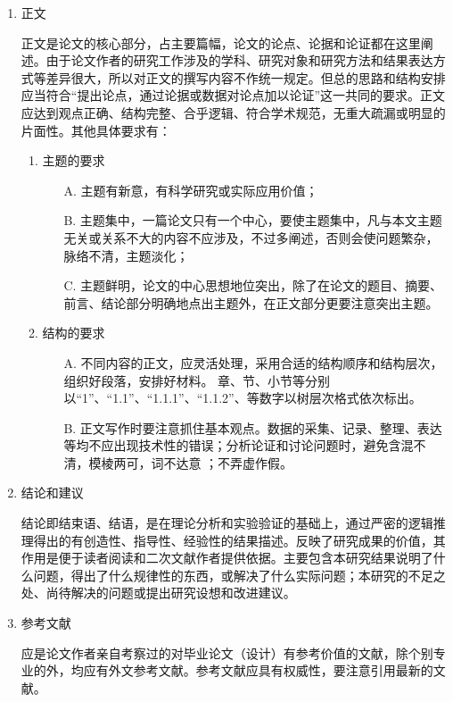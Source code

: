 \begin{itemize}[font=\cusong]
\begin{enumerate}[label=\bfseries\arabic*.]
\item {\cusong 正文}\par
      正文是论文的核心部分，占主要篇幅，论文的论点、论据和论证都在这里阐述。由于论文作者的研究工作涉及的学科、研究对象和研究方法和结果表达方式等差异很大，所以对正文的撰写内容不作统一规定。但总的思路和结构安排应当符合“提出论点，通过论据或数据对论点加以论证”这一共同的要求。正文应达到观点正确、结构完整、合乎逻辑、符合学术规范，无重大疏漏或明显的片面性。其他具体要求有：
\begin{enumerate}[label=(\arabic* )]%
\item 主题的要求\par
\begin{itemize}[fullwidth,itemindent=2em]
\item[A.]	主题有新意，有科学研究或实际应用价值；
\item[B.]	主题集中，一篇论文只有一个中心，要使主题集中，凡与本文主题无关或关系不大的内容不应涉及，不过多阐述，否则会使问题繁杂，脉络不清，主题淡化；
\item[C.]	主题鲜明，论文的中心思想地位突出，除了在论文的题目、摘要、前言、结论部分明确地点出主题外，在正文部分更要注意突出主题。
\end{itemize}
\item 结构的要求\par
\begin{itemize}[fullwidth,itemindent=2em]
\item[A.]	不同内容的正文，应灵活处理，采用合适的结构顺序和结构层次，组织好段落，安排好材料。 章、节、小节等分别以“1”、“1.1”、“1.1.1”、“1.1.2”、等数字以树层次格式依次标出。
\item[B.]	正文写作时要注意抓住基本观点。数据的采集、记录、整理、表达等均不应出现技术性的错误；分析论证和讨论问题时，避免含混不清，模棱两可，词不达意 ；不弄虚作假。
\end{itemize}
\end{enumerate}
\item {\cusong 结论和建议}\par
结论即结束语、结语，是在理论分析和实验验证的基础上，通过严密的逻辑推理得出的有创造性、指导性、经验性的结果描述。反映了研究成果的价值，其作用是便于读者阅读和二次文献作者提供依据。主要包含本研究结果说明了什么问题，得出了什么规律性的东西，或解决了什么实际问题；本研究的不足之处、尚待解决的问题或提出研究设想和改进建议。
\item {\cusong 参考文献}\par
 应是论文作者亲自考察过的对毕业论文（设计）有参考价值的文献，除个别专业的外，均应有外文参考文献。参考文献应具有权威性，要注意引用最新的文献。\par

\end{enumerate}
\end{itemize}
